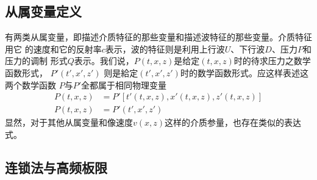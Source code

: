 \subsection{从属变量定义}
\label{sec:2.6.2}
有两类从属变量，即描述介质特征的那些变量和描述波特征的那些变量。介质特征用它
的速度和它的反射率$c$表示，波的特征则是利用上行波$U$、下行波$D$、压力$P$和压力的调制
形式$Q$表示。我们说，$P(t,x,z)$是给定$(t,x,z)$时的待求压力之数学函数形式， $P'(t',x',z')$
则是給定$(t',x',z')$时的数学函数形式。应这样表述这两个数学函数
$P$与$P'$全都属于相同物理变量
\begin{equation}
\begin{split}
P(t,x,z) &= P'[t'(t,x,z),x'(t,x,z),z'(t,x,z)]\\
P(t,x,z) &= P'(t',x',z')
\end{split}
\label{eq:ex2.6.2}
\end{equation}
显然，对于其他从属变量和像速度$v(x,z)$这样的介质参量，也存在类似的表达式。

\subsection{连锁法与高频板限}
\label{sec:2.6.3}

